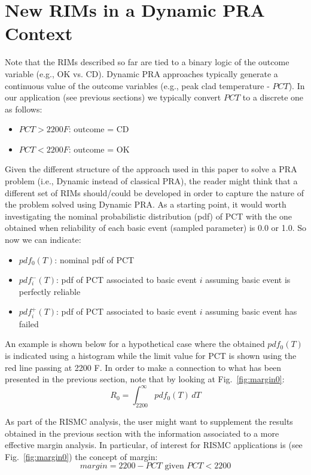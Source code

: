 \section{New RIMs in a Dynamic PRA Context}
\label{sec:newRIM}

Note that the RIMs described so far are tied to a binary logic of the outcome 
variable (e.g., OK vs. CD). Dynamic PRA approaches typically generate a continuous 
value of the outcome variables (e.g., peak clad temperature - $PCT$). 
In our application (see previous sections) we typically convert $PCT$ to a discrete 
one as follows:
\begin{itemize}
  \item $PCT>2200 F$: outcome = CD
  \item $PCT<2200 F$: outcome = OK
\end{itemize}
  
Given the different structure of the approach used in this paper to solve a PRA 
problem (i.e., Dynamic instead of classical PRA), the reader might think that a different 
set of RIMs should/could be developed in order to capture the nature of the problem 
solved using Dynamic PRA.
As a starting point, it would worth investigating the nominal probabilistic distribution 
(pdf) of PCT with the one obtained when reliability of each basic event (sampled parameter) 
is 0.0 or 1.0. So now we can indicate:
\begin{itemize}
  \item $pdf_0 (T)$: nominal pdf of PCT
  \item $pdf_i^-(T)$: pdf of PCT associated to basic event $i$ assuming basic event is perfectly 
        reliable
  \item $pdf_i^+(T)$: pdf of PCT associated to basic event $i$ assuming basic event has failed
\end{itemize}

An example is shown below for a hypothetical case where the obtained $pdf_0(T)$ is indicated 
using a histogram while the limit value for PCT is shown using the red line passing at 2200 F.
In order to make a connection to what has been presented in the previous section, note that by 
looking at Fig.~\ref{fig:margin0}:
\begin{equation}
  R_0 = \int_{2200}^\infty \! pdf_0(T) \, dT
  \label{eq:R0}
\end{equation}

As part of the RISMC analysis, the user might want to supplement the results obtained in the 
previous section with the information associated to a more effective margin analysis.
In particular, of interest for RISMC applications is (see Fig.~\ref{fig:margin0}) the concept of margin:
\begin{equation}
  margin= 2200-PCT \text{ given } PCT<2200
  \label{eq:margin}
\end{equation}

